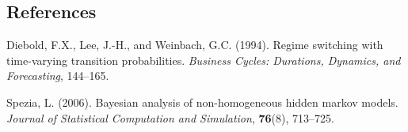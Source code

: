 \documentclass[12pt]{article}
\begin{document}
%        
%
%        

\subsection*{References}

\begin{description}

\item
Diebold, F.X., Lee, J.-H., and Weinbach, G.C. (1994). Regime switching with time-varying transition probabilities.
\textit{Business Cycles: Durations, Dynamics, and Forecasting},
144--165.

\item
Spezia, L. (2006). Bayesian analysis of non-homogeneous hidden markov models.
\textit{Journal of Statistical Computation and Simulation},
\textbf{76}(8), 713--725.

\end{description}
\end{document}
